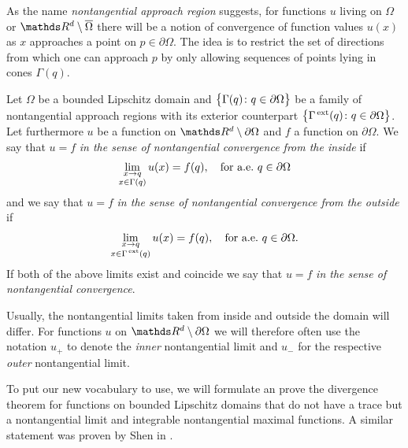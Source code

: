 As the name \emph{nontangential approach region} suggests, for functions $u$ living on $\Omega$ or $\R^d \setminus \overline\Omega$ there will be a notion of convergence of function values $u(x)$ as $x$ approaches a point on $p \in \partial\Omega$.
The idea is to restrict the set of directions from which one can approach $p$ by only allowing sequences of points lying in cones $\Gamma(q)$.

\begin{defn}
  Let $\Omega$ be a bounded Lipschitz domain and $\big\{\Gamma(q) \colon q \in \partial\Omega\big\}$ be a family of nontangential approach regions with its exterior counterpart $\big\{\Gamma^{\,\mathrm{ext}}(q) \colon q \in \partial\Omega\big\}$.
  Let furthermore $u$ be a function on $\R^d \setminus \partial\Omega$ and $f$ a function on $\partial\Omega$.
  We say that $u = f$ \emph{in the sense of nontangential convergence from the inside} if 
  \begin{align*}
    \lim_{\substack{ x \to q \\ x \in \ShenCone(q)}} u(x) = f(q), \quad\text{for a.e.\@ } q \in \partial\Omega
  \end{align*}
  and we say that $u = f$ \emph{in the sense of nontangential convergence from the outside} if 
  \begin{align*}
    \lim_{\substack{ x \to q \\ x \in \ShenCone^{\,\mathrm{ext}}(q)}} u(x) = f(q), \quad\text{for a.e.\@ } q \in \partial\Omega.
  \end{align*}
  If both of the above limits exist and coincide we say that $u = f$ \emph{in the sense of nontangential convergence}.
\end{defn}

Usually, the nontangential limits taken from inside and outside the domain will differ.
For functions $u$ on $\R^d \setminus \partial\Omega$ we will therefore often use the notation $u_+$ to denote the \emph{inner} nontangential limit and $u_-$ for the respective \emph{outer} nontangential limit.

To put our new vocabulary to use, we will formulate an prove the divergence theorem for functions on bounded Lipschitz domains that do not have a trace but a nontangential limit and integrable nontangential maximal functions. A similar statement was proven by Shen in \cite[Thm.\@~7.1.6]{Shen2017}.

